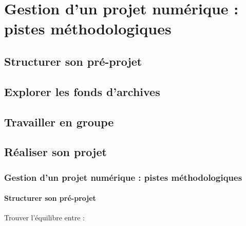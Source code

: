 \documentclass[xcolor=table]{beamer}
\begin{document}
\section{Gestion d'un projet num\'erique : pistes m\'ethodologiques}
\subsection{Structurer son pr\'e-projet}
\subsection{Explorer les fonds d'archives}
\subsection{Travailler en groupe}
\subsection{R\'ealiser son projet}

\begin{frame}[plain]
\frametitle{Gestion d'un projet num\'erique : pistes m\'ethodologiques}
\framesubtitle{Structurer son pr\'e-projet}
Trouver l'\'equilibre entre : 
    \begin{figure}
    \centering
{}
    \end{figure}
\end{frame}
\end{document}
